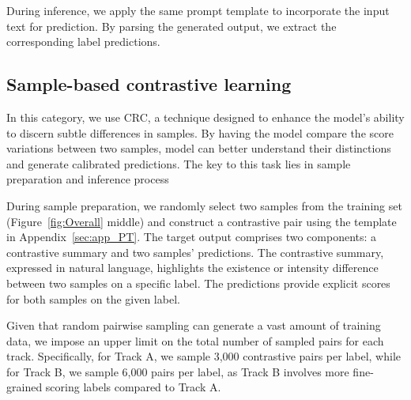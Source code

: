 \documentclass[11pt]{article}
\begin{document}
During inference, we apply the same prompt template to incorporate the input text for prediction. By parsing the generated output, we extract the corresponding label predictions.

\subsection{Sample-based contrastive learning}
\label{sec:CRC}
In this category, we use CRC, a technique designed to enhance the model’s ability to discern subtle differences in samples. 
By having the model compare the score variations between two samples, model can better understand their distinctions and generate calibrated predictions.
The key to this task lies in sample preparation and inference process


During sample preparation, we randomly select two samples from the training set (Figure~\ref{fig:Overall} middle) and construct a contrastive pair using the template in Appendix~\ref{sec:app_PT}. The target output comprises two components: a contrastive summary and two samples' predictions. The contrastive summary, expressed in natural language, highlights the existence or intensity difference between two samples on a specific label. The predictions provide explicit scores for both samples on the given label. 


Given that random pairwise sampling can generate a vast amount of training data, we impose an upper limit on the total number of sampled pairs for each track. Specifically, for Track A, we sample 3,000 contrastive pairs per label, while for Track B, we sample 6,000 pairs per label, as Track B involves more fine-grained scoring labels compared to Track A.
\end{document}
